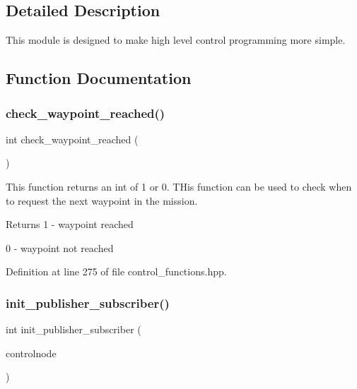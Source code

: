 \subsection{Detailed Description}
This module is designed to make high level control programming more simple. 

\subsection{Function Documentation}
\mbox{\label{group__control__functions_ga54abc3f6eae022a8710bc0c2e1c54fbe}} 
\subsubsection{\texorpdfstring{check\_waypoint\_reached()}{check\_waypoint\_reached()}}
{\footnotesize\ttfamily int check\+\_\+waypoint\+\_\+reached (\begin{DoxyParamCaption}{ }\end{DoxyParamCaption})}

This function returns an int of 1 or 0. T\+His function can be used to check when to request the next waypoint in the mission. \begin{DoxyReturn}{Returns}
1 -\/ waypoint reached 

0 -\/ waypoint not reached 
\end{DoxyReturn}


Definition at line 275 of file control\+\_\+functions.\+hpp.

\mbox{\label{group__control__functions_gae693b071b5392f9253cdfc1f4f362fcc}} 
\subsubsection{\texorpdfstring{init\_publisher\_subscriber()}{init\_publisher\_subscriber()}}
{\footnotesize\ttfamily int init\+\_\+publisher\+\_\+subscriber (\begin{DoxyParamCaption}\item[{ros\+::\+Node\+Handle}]{controlnode }\end{DoxyParamCaption})}

